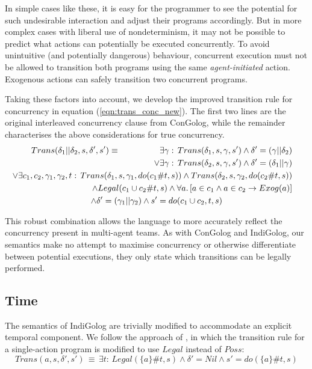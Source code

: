 In simple cases like these, it is easy for the programmer to see the
potential for such undesirable interaction and adjust their programs
accordingly. But in more complex cases with liberal use of nondeterminism,
it may not be possible to predict what actions can potentially be
executed concurrently. To avoid unintuitive (and potentially dangerous)
behaviour, concurrent execution must not be allowed to transition
both programs using the same \emph{agent-initiated} action. Exogenous
actions can safely transition two concurrent programs.

Taking these factors into account, we develop the improved transition
rule for concurrency in equation (\ref{eqn:trans_conc_new}). The
first two lines are the original interleaved concurrency clause from
ConGolog, while the remainder characterises the above considerations
for true concurrency.\begin{multline}
Trans(\delta_{1}||\delta_{2},s,\delta',s')\equiv\,\,\,\,\,\,\,\,\,\,\,\,\,\,\,\,\,\,\,\,\,\,\,\,\,\,\,\,\shoveright{\exists\gamma:\, Trans(\delta_{1},s,\gamma,s')\wedge\delta'=(\gamma||\delta_{2})}\\
\shoveright{\vee\exists\gamma:\, Trans(\delta_{2},s,\gamma,s')\wedge\delta'=(\delta_{1}||\gamma)}\\
\shoveright{\vee\exists c_{1},c_{2},\gamma_{1},\gamma_{2},t:\, Trans(\delta_{1},s,\gamma_{1},do(c_{1}\#t,s))\wedge Trans(\delta_{2},s,\gamma_{2},do(c_{2}\#t,s))}\\
\shoveright{\wedge Legal(c_{1}\cup c_{2}\#t,s)\wedge\forall a.\left[a\in c_{1}\wedge a\in c_{2}\rightarrow Exog(a)\right]}\\
\wedge\delta'=(\gamma_{1}||\gamma_{2})\wedge s'=do(c_{1}\cup c_{2},t,s)\label{eqn:trans_conc_new}\end{multline}


This robust combination allows the language to more accurately reflect
the concurrency present in multi-agent teams. As with ConGolog and
IndiGolog, our semantics make no attempt to maximise concurrency or
otherwise differentiate between potential executions, they only state
which transitions can be legally performed.


\subsection{Time}

The semantics of IndiGolog are trivially modified to accommodate an
explicit temporal component. We follow the approach of \citep{Reiter98seq_temp_golog,reiter01kia},
in which the transition rule for a single-action program is modified
to use $Legal$ instead of $Poss$:\[
Trans(a,s,\delta',s')\,\equiv\,\exists t:\, Legal(\{a\}\#t,s)\wedge\delta'=Nil\wedge s'=do(\{a\}\#t,s)\]


